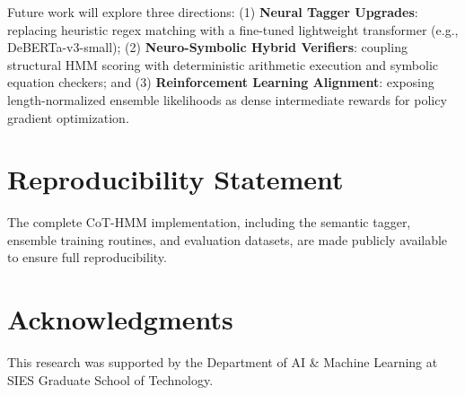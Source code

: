 \documentclass[conference]{IEEEtran}
\begin{document}
Future work will explore three directions: (1) \textbf{Neural Tagger Upgrades}: replacing heuristic regex matching with a fine-tuned lightweight transformer (e.g., DeBERTa-v3-small); (2) \textbf{Neuro-Symbolic Hybrid Verifiers}: coupling structural HMM scoring with deterministic arithmetic execution and symbolic equation checkers; and (3) \textbf{Reinforcement Learning Alignment}: exposing length-normalized ensemble likelihoods as dense intermediate rewards for policy gradient optimization.

\section*{Reproducibility Statement}
The complete CoT-HMM implementation, including the semantic tagger, ensemble training routines, and evaluation datasets, are made publicly available to ensure full reproducibility.

\section*{Acknowledgments}
This research was supported by the Department of AI \& Machine Learning at SIES Graduate School of Technology.
\end{document}
